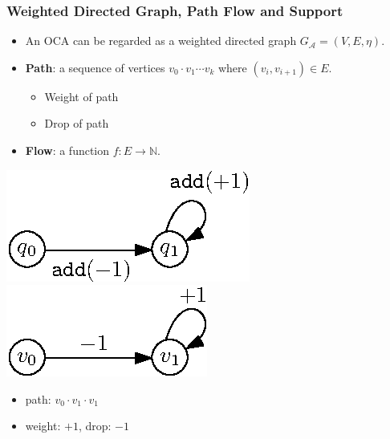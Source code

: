 \documentclass[11pt]{beamer}
\begin{document}
\begin{frame}\frametitle{Weighted Directed Graph,  Path Flow and Support}
\begin{itemize}

\item An OCA can be regarded as a weighted directed graph $G_\mathcal{A} = (V,E,\eta)$.
\pause
\item \textbf{Path}: a sequence of vertices $v_0\cdot v_1 \cdots v_k$ where $(v_i, v_{i+1}) \in E$.
\pause
\begin{itemize}
\item Weight of path
\item Drop of path
\end{itemize}
\pause
\item \textbf{Flow}: a function $f: E\rightarrow \mathbb{N}$.
\end{itemize}

\begin{example}
\begin{center}
\includegraphics[scale=1]{reachexample2.eps}
\includegraphics[scale=1]{wg.eps}
\begin{itemize}

\item path: $v_0\cdot v_1\cdot v_1$
\item weight: $+1$, drop: $-1$
\end{itemize}
\end{center}


\end{example}
\end{frame}
\end{document}
